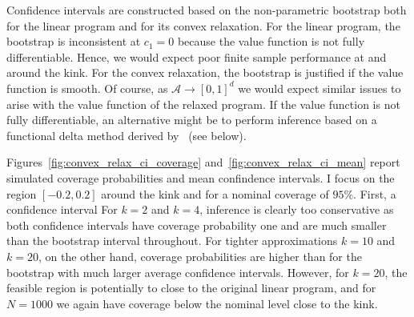 \documentclass[12pt,a4paper,english]{article} %
\numberwithin{equation}{section}
\theoremstyle{definition}
\theoremstyle{remark}
\theoremstyle{plain}
\begin{document}
Confidence intervals are constructed based on the non-parametric bootstrap both for the linear program and for its convex relaxation.
For the linear program, the bootstrap is inconsistent at $c_1=0$ because the value function is not fully differentiable.
Hence, we would expect poor finite sample performance at and around the kink.
For the convex relaxation, the bootstrap is justified if the value function is smooth.
Of course, as $\mathcal{A}\to [0,1]^d$ we would expect similar issues to arise with the value function of the relaxed program.
If the value function is not fully differentiable, an alternative might be to perform inference based on a functional delta method derived by~\cite{shapiro1991asymptotic} (see below).

Figures~\ref{fig:convex_relax_ci_coverage} and~\ref{fig:convex_relax_ci_mean} report simulated coverage probabilities and mean confindence intervals.
I focus on the region $[-0.2, 0.2]$ around the kink and for a nominal coverage of $95\%$.
First, a confidence interval
For $k=2$ and $k=4$, inference is clearly too conservative as both confidence intervals have coverage probability one and are much smaller than the bootstrap interval throughout.
For tighter approximations $k=10$ and $k=20$, on the other hand, coverage probabilities are higher than for the bootstrap with much larger average confidence intervals.
However, for $k=20$, the feasible region is potentially to close to the original linear program, and for $N=1000$ we again have coverage below the nominal level close to the kink.
\end{document}
